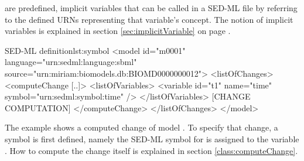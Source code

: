  are predefined, implicit variables that can be called in a SED-ML file by referring to the defined URNs representing that variable's concept. The notion of implicit variables is explained in section \ref{sec:implicitVariable} on page .

%
\begin{myXmlLst}{SED-ML  definition}{lst:symbol}
<model id="m0001" language="urn:sedml:language:sbml" 
 source="urn:miriam:biomodels.db:BIOMD0000000012">
 <listOfChanges>
  <computeChange [..]> 
   <listOfVariables>
    <variable id="t1" name="time" symbol="urn:sedml:symbol:time" />
   </listOfVariables>
   [CHANGE COMPUTATION]
  </computeChange>
 </listOfChanges>
</model>
\end{myXmlLst}
%
The example shows a computed change of model . To specify that change, a symbol is first defined, namely the SED-ML symbol for  is assigned to the variable . How to compute the change itself is explained in section \ref{class:computeChange}.

